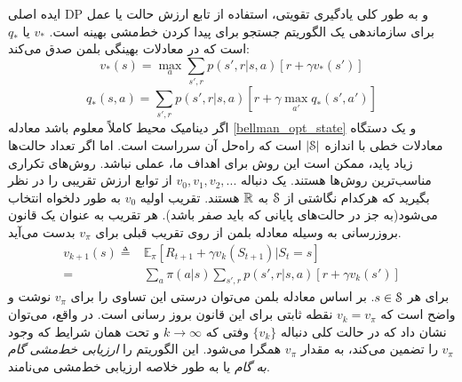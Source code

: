 ایده اصلی DP و به طور کلی یادگیری تقویتی‌، استفاده از تابع ارزش حالت یا عمل برای سازماندهی یک الگوریتم جستجو برای پیدا کردن خط‌مشی بهینه است.
$v_*$
یا
$q_*$
است
که در معادلات بهینگی بلمن صدق می‌کند:
\begin{equation}
v_{*}(s) = \max_{a} \sum_{s',r} p(s',r | s,a)[r + \gamma v_*(s')]
\label{bellman_opt_state}
\end{equation}
\begin{equation}
q_{*}(s,a) = \sum_{s',r} p(s',r | s,a)[r + \gamma \max_{a'} q_* (s',a')]
\label{bellman_opt_action}
\end{equation}
اگر دینامیک محیط کاملاً معلوم باشد معادله
\ref{bellman_opt_state}
و
یک دستگاه معادلات خطی با اندازه
 $|\EuScript{S}|$
  است
 که راه‌حل آن سرراست است. اما اگر تعداد حالت‌ها زیاد پاید، ممکن است این روش 
 برای اهداف ما، عملی نباشد. روش‌های تکراری مناسب‌ترین روش‌ها هستند. یک دنباله $ v_0 , v_1 , v_2 , ...$ 
از توابع ارزش تقریبی
را در نظر بگیرید که هرکدام نگاشتی از
$\EuScript{S}$ 
به 
$\mathbb{R}$
 هستند.
تقریب اولیه $v_0$
به طور دلخواه انتخاب می‌شود(به جز در حالت‌های پایانی که باید صفر باشد). هر تقریب به عنوان یک قانون بروزرسانی به وسیله معادله بلمن از روی تقریب قبلی برای
$v_\pi$
بدست می‌آید. 
\begin{align}
v_{k+1}(s) \triangleq & \mathbb{E}_{\pi} [R_{t+1} + \gamma v_k(S_{t+1}) | S_t=s]  \nonumber \\
=& \sum_{a} \pi(a|s) \sum_{s',r} p(s',r | s,a)[r + \gamma v_k(s')]
\end{align}
 برای هر 
 $s \in \EuScript{S}$.
 بر اساس معادله بلمن می‌توان درستی این تساوی را برای 
$v_{\pi}$
نوشت و واضح است که 
 $v_k = v_{\pi}$
 نقطه ثابتی برای این قانون بروز رسانی است.
 در واقع، می‌توان نشان داد که در حالت کلی دنباله 
 $\{ v_k \}$
وفتی که 
$ k \rightarrow \infty $
و تحت همان شرایط که وجود 
$v_{\pi}$
را تضمین می‌کند، به مقدار 
$v_{\pi}$
همگرا می‌شود.  این الگوریتم را 
\textit{ارزیابی خط‌مشی گام به گام}
 یا به طور خلاصه 
ارزیابی خط‌مشی  می‌نامند.
 

